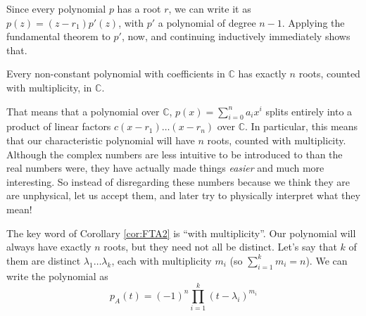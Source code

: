 	 Since every polynomial $p$ has a root $r$, we can write it as $p(z) = (z-r_1) p'(z)$, with $p'$ a polynomial of degree $n-1$.
	 Applying the fundamental theorem to $p'$, now, and continuing inductively immediately shows that.
	 \begin{cor}\label{cor:FTA2}
	 	Every non-constant polynomial with coefficients in $\mathbb{C}$ has exactly $n$ roots, counted with multiplicity, in $\mathbb C$. 
	 \end{cor}
	 That means that a polynomial over $\mathbb C$, $p(x) = \sum_{i = 0}^n a_i x^i$ splits entirely into a product of linear factors $c (x-r_1) \dots (x-r_n)$ over $\mathbb C$. In particular, this means that our characteristic polynomial will have $n$ roots, counted with multiplicity. Although the complex numbers are less intuitive to be introduced to than the real numbers were, they have actually made things \emph{easier} and much more interesting. So instead of disregarding these numbers because we think they are are unphysical, let us accept them, and later try to physically interpret what they mean!
	 
	 
	The key word of Corollary \ref{cor:FTA2} is ``with multiplicity''. Our polynomial will always have exactly $n$ roots, but they need not all be distinct. Let's say that $k$ of them are distinct $\lambda_1 \dots \lambda_k$, each with multiplicity $m_i$ (so $\sum_{i=1}^k m_i = n$). We can write the polynomial as
	\begin{equation}
		p_A(t)  = (-1)^n \prod_{i=1}^k (t - \lambda_i)^{m_i}
	\end{equation}
	

